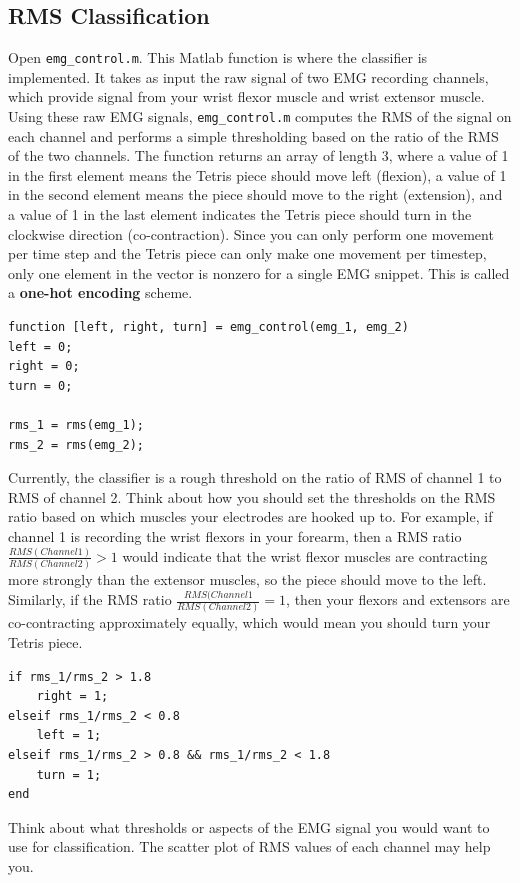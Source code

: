 \documentclass[10pt,oneside,a4paper]{article}
\begin{document}
\subsection{RMS Classification}
Open \texttt{emg\_control.m}. This Matlab function is where the classifier is implemented. It takes as input the raw signal of two EMG recording channels, which provide signal from your wrist flexor muscle and wrist extensor muscle. Using these raw EMG signals, \texttt{emg\_control.m} computes the RMS of the signal on each channel and performs a simple thresholding based on the ratio of the RMS of the two channels. The function returns an array of length 3, where a value of 1 in the first element means the Tetris piece should move left (flexion), a value of 1 in the second element means the piece should move to the right (extension), and a value of 1 in the last element indicates the Tetris piece should turn in the clockwise direction (co-contraction). Since you can only perform one movement per time step and the Tetris piece can only make one movement per timestep, only one element in the vector is nonzero for a single EMG snippet. This is called a \textbf{one-hot encoding} scheme. 
\begin{verbatim}
function [left, right, turn] = emg_control(emg_1, emg_2)
left = 0;
right = 0;
turn = 0;

rms_1 = rms(emg_1);
rms_2 = rms(emg_2);
\end{verbatim}
 
Currently, the classifier is a rough threshold on the ratio of RMS of channel 1 to RMS of channel 2. Think about how you should set the thresholds on the RMS ratio based on which muscles your electrodes are hooked up to. For example, if channel 1 is recording the wrist flexors in your forearm, then a RMS ratio $\frac{RMS(Channel1)}{RMS(Channel2)} > 1$ would indicate that the wrist flexor muscles are contracting more strongly than the extensor muscles, so the piece should move to the left. Similarly, if the RMS ratio $\frac{RMS(Channel1}{RMS(Channel2)} = 1$, then your flexors and extensors are co-contracting approximately equally, which would mean you should turn your Tetris piece. 
\begin{verbatim}
if rms_1/rms_2 > 1.8
    right = 1;
elseif rms_1/rms_2 < 0.8
    left = 1;
elseif rms_1/rms_2 > 0.8 && rms_1/rms_2 < 1.8
    turn = 1;
end
\end{verbatim}
Think about what thresholds or aspects of the EMG signal you would want to use for classification. The scatter plot of RMS values of each channel may help you.
\end{document}
